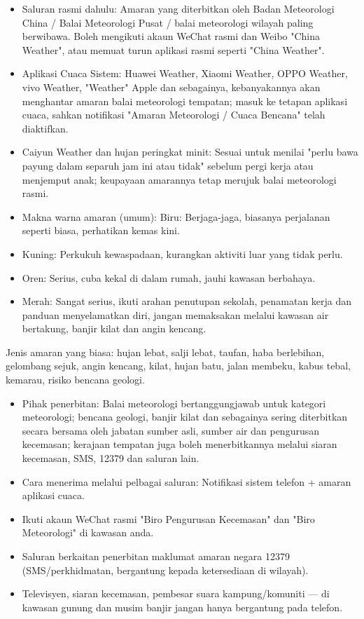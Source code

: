 \begin{itemize}
  \item Saluran rasmi dahulu: Amaran yang diterbitkan oleh Badan Meteorologi China / Balai Meteorologi Pusat / balai meteorologi wilayah paling berwibawa. Boleh mengikuti akaun WeChat rasmi dan Weibo "China Weather", atau memuat turun aplikasi rasmi seperti "China Weather".
  \item Aplikasi Cuaca Sistem: Huawei Weather, Xiaomi Weather, OPPO Weather, vivo Weather, "Weather" Apple dan sebagainya, kebanyakannya akan menghantar amaran balai meteorologi tempatan; masuk ke tetapan aplikasi cuaca, sahkan notifikasi "Amaran Meteorologi / Cuaca Bencana" telah diaktifkan.
  \item Caiyun Weather dan hujan peringkat minit: Sesuai untuk menilai "perlu bawa payung dalam separuh jam ini atau tidak" sebelum pergi kerja atau menjemput anak; keupayaan amarannya tetap merujuk balai meteorologi rasmi.
  \item Makna warna amaran (umum): Biru: Berjaga-jaga, biasanya perjalanan seperti biasa, perhatikan kemas kini.
  \item Kuning: Perkukuh kewaspadaan, kurangkan aktiviti luar yang tidak perlu.
  \item Oren: Serius, cuba kekal di dalam rumah, jauhi kawasan berbahaya.
  \item Merah: Sangat serius, ikuti arahan penutupan sekolah, penamatan kerja dan panduan menyelamatkan diri, jangan memaksakan melalui kawasan air bertakung, banjir kilat dan angin kencang.
\end{itemize}

Jenis amaran yang biasa: hujan lebat, salji lebat, taufan, haba berlebihan, gelombang sejuk, angin kencang, kilat, hujan batu, jalan membeku, kabus tebal, kemarau, risiko bencana geologi.


\begin{itemize}
  \item Pihak penerbitan: Balai meteorologi bertanggungjawab untuk kategori meteorologi; bencana geologi, banjir kilat dan sebagainya sering diterbitkan secara bersama oleh jabatan sumber asli, sumber air dan pengurusan kecemasan; kerajaan tempatan juga boleh menerbitkannya melalui siaran kecemasan, SMS, 12379 dan saluran lain.
  \item Cara menerima melalui pelbagai saluran: Notifikasi sistem telefon + amaran aplikasi cuaca.
  \item Ikuti akaun WeChat rasmi "Biro Pengurusan Kecemasan" dan "Biro Meteorologi" di kawasan anda.
  \item Saluran berkaitan penerbitan maklumat amaran negara 12379 (SMS/perkhidmatan, bergantung kepada ketersediaan di wilayah).
  \item Televisyen, siaran kecemasan, pembesar suara kampung/komuniti — di kawasan gunung dan musim banjir jangan hanya bergantung pada telefon.
\end{itemize}

